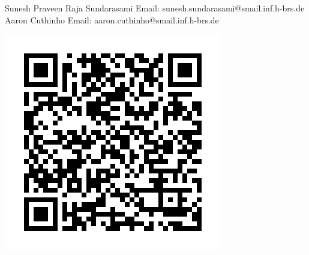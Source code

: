 

    {
        \begin{minipage}{0.75\linewidth}
            Sunesh Praveen Raja Sundarasami\newline
            Email: sunesh.sundarasami@smail.inf.h-brs.de\newline
            Aaron Cuthinho\newline
            Email: aaron.cuthinho@smail.inf.h-brs.de\newline



        \end{minipage}
        \begin{minipage}{0.24\linewidth}
            \vspace{-1.5cm}
            \begin{tikzfigure}
                \includegraphics[scale=0.5]{figures/sunesh-aaron_qrcode.png}
            \end{tikzfigure}
        \end{minipage}


}
